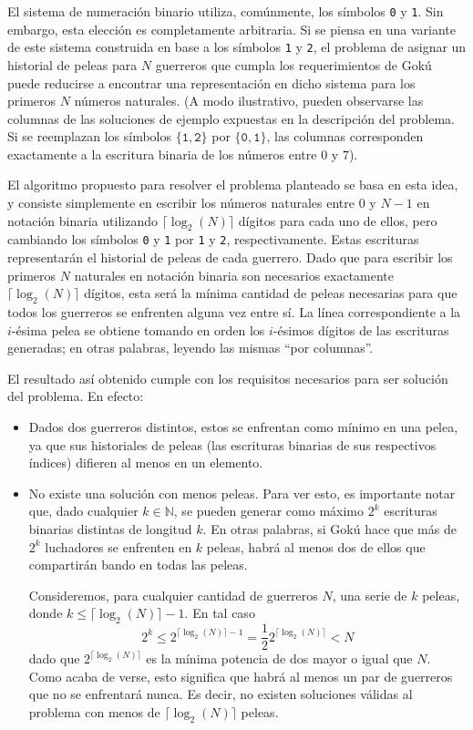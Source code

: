         El sistema de numeración binario utiliza, comúnmente, los símbolos \texttt{0} y \texttt{1}. Sin embargo, esta elección es completamente arbitraria. Si se piensa en una variante de este sistema construida en base a los símbolos \texttt{1} y \texttt{2}, el problema de asignar un historial de peleas para $N$ guerreros que cumpla los requerimientos de Gokú puede reducirse a encontrar una representación en dicho sistema para los primeros $N$ números naturales. (A modo ilustrativo, pueden observarse las columnas de las soluciones de ejemplo expuestas en la descripción del problema. Si se reemplazan los símbolos $\lbrace\mathtt{1},\mathtt{2}\rbrace$ por $\lbrace\mathtt{0},\mathtt{1}\rbrace$, las columnas corresponden exactamente a la escritura binaria de los números entre $0$ y $7$).

        El algoritmo propuesto para resolver el problema planteado se basa en esta idea, y consiste simplemente en escribir los números naturales entre $0$ y $N-1$ en notación binaria utilizando $\lceil \log_2(N) \rceil$ dígitos para cada uno de ellos, pero cambiando los símbolos \texttt{0} y \texttt{1} por \texttt{1} y \texttt{2}, respectivamente. Estas escrituras representarán el historial de peleas de cada guerrero. Dado que para escribir los primeros $N$ naturales en notación binaria son necesarios exactamente $\lceil\log_2(N)\rceil$ dígitos, esta será la mínima cantidad de peleas necesarias para que todos los guerreros se enfrenten alguna vez entre sí. La línea correspondiente a la $i$-ésima pelea se obtiene tomando en orden los $i$-ésimos dígitos de las escrituras generadas; en otras palabras, leyendo las mismas ``por columnas''.

        El resultado así obtenido cumple con los requisitos necesarios para ser solución del problema. En efecto:
        \begin{itemize}
            \item Dados dos guerreros distintos, estos se enfrentan como mínimo en una pelea, ya que sus historiales de peleas (las escrituras binarias de sus respectivos índices) difieren al menos en un elemento.

            \item No existe una solución con menos peleas. Para ver esto, es importante notar que, dado cualquier $k \in \mathbb{N}$, se pueden generar como máximo $2^k$ escrituras binarias distintas de longitud $k$. En otras palabras, si Gokú hace que más de $2^k$ luchadores se enfrenten en $k$ peleas, habrá al menos dos de ellos que compartirán bando en todas las peleas.

            Consideremos, para cualquier cantidad de guerreros $N$, una serie de $k$ peleas, donde $k \leq \lceil \log_2(N) \rceil - 1$. En tal caso
            \[ 2^k \leq 2^{\lceil \log_2(N) \rceil - 1} = \frac{1}{2} 2^{\lceil \log_2(N) \rceil} < N\]
            dado que $ 2^{\lceil \log_2(N) \rceil}$ es la mínima potencia de dos mayor o igual que $N$. Como acaba de verse, esto significa que habrá al menos un par de guerreros que no se enfrentará nunca. Es decir, no existen soluciones válidas al problema con menos de $\lceil \log_2(N) \rceil$ peleas.
        \end{itemize}

